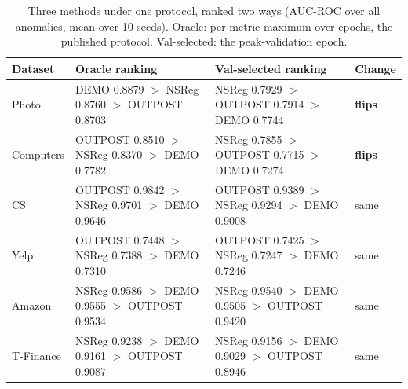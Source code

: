 \begin{table}[t]
\centering
\small
\begin{tabular}{llll}
\toprule
Dataset & Oracle ranking & Val-selected ranking & Change \\
\midrule
Photo & DEMO 0.8879 $>$ NSReg 0.8760 $>$ OUTPOST 0.8703 & NSReg 0.7929 $>$ OUTPOST 0.7914 $>$ DEMO 0.7744 & \textbf{flips} \\
Computers & OUTPOST 0.8510 $>$ NSReg 0.8370 $>$ DEMO 0.7782 & NSReg 0.7855 $>$ OUTPOST 0.7715 $>$ DEMO 0.7274 & \textbf{flips} \\
CS & OUTPOST 0.9842 $>$ NSReg 0.9701 $>$ DEMO 0.9646 & OUTPOST 0.9389 $>$ NSReg 0.9294 $>$ DEMO 0.9008 & same \\
Yelp & OUTPOST 0.7448 $>$ NSReg 0.7388 $>$ DEMO 0.7310 & OUTPOST 0.7425 $>$ NSReg 0.7247 $>$ DEMO 0.7246 & same \\
Amazon & NSReg 0.9586 $>$ DEMO 0.9555 $>$ OUTPOST 0.9534 & NSReg 0.9540 $>$ DEMO 0.9505 $>$ OUTPOST 0.9420 & same \\
T-Finance & NSReg 0.9238 $>$ DEMO 0.9161 $>$ OUTPOST 0.9087 & NSReg 0.9156 $>$ DEMO 0.9029 $>$ OUTPOST 0.8946 & same \\
\bottomrule
\end{tabular}
\caption{Three methods under one protocol, ranked two ways (AUC-ROC over all anomalies, mean over 10 seeds). Oracle: per-metric maximum over epochs, the published protocol. Val-selected: the peak-validation epoch.}
\label{tab:three_method}
\end{table}
